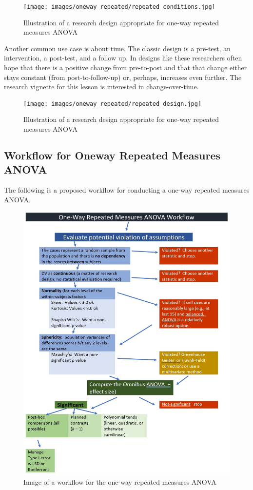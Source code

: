 \documentclass[
  11pt,
]{book}
\begin{document}
\begin{figure}
\centering
\texttt{[image: images/oneway\_repeated/repeated\_conditions.jpg]}
\caption{Illustration of a research design appropriate for one-way repeated measures ANOVA}
\end{figure}

Another common use case is about time. The classic design is a pre-test, an intervention, a post-test, and a follow up. In designs like these researchers often hope that there is a positive change from pre-to-post and that that change either stays constant (from post-to-follow-up) or, perhaps, increases even further. The research vignette for this lesson is interested in change-over-time.

\begin{figure}
\centering
\texttt{[image: images/oneway\_repeated/repeated\_design.jpg]}
\caption{Illustration of a research design appropriate for one-way repeated measures ANOVA}
\end{figure}

\hypertarget{workflow-for-oneway-repeated-measures-anova}{%
\subsection{Workflow for Oneway Repeated Measures ANOVA}\label{workflow-for-oneway-repeated-measures-anova}}

The following is a proposed workflow for conducting a one-way repeated measures ANOVA.

\begin{figure}
\centering
\includegraphics{images/oneway_repeated/wf_repeated.jpg}
\caption{Image of a workflow for the one-way repeated measures ANOVA}
\end{figure}
\end{document}
